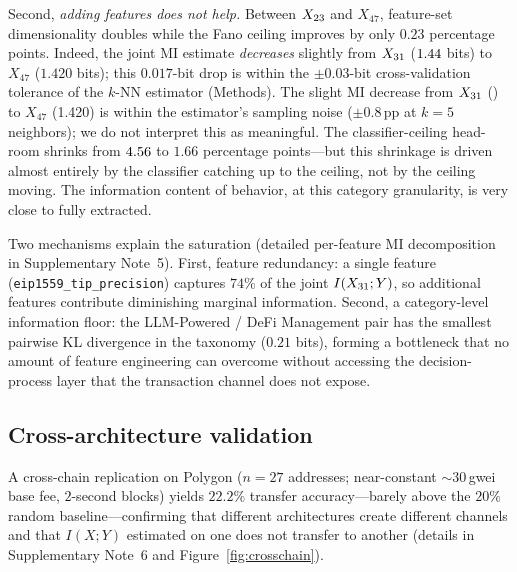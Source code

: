\documentclass[11pt,a4paper]{article}
\begin{document}
Second, \emph{adding features does not help.} Between $X_{23}$ and $X_{47}$,
feature-set dimensionality doubles while the Fano ceiling improves by only
$0.23$ percentage points. Indeed, the joint MI estimate \emph{decreases}
slightly from $X_{31}$ ($1.44$ bits) to $X_{47}$ ($1.420$ bits); this
$0.017$-bit drop is within the $\pm 0.03$-bit cross-validation tolerance
of the $k$-NN estimator (Methods). The slight MI decrease from $X_{31}$
(\fanoMiJointBitsfeat) to $X_{47}$ (1.420) is within the estimator's sampling noise
($\pm$0.8\,pp at $k{=}5$ neighbors); we do not interpret this as
meaningful.
The classifier-ceiling head-room shrinks from
$4.56$ to $1.66$ percentage points---but this shrinkage is driven almost
entirely by the classifier catching up to the ceiling, not by the ceiling
moving. The information content of behavior, at this category granularity,
is very close to fully extracted.

Two mechanisms explain the saturation (detailed per-feature MI
decomposition in Supplementary Note~5). First, feature redundancy: a
single feature (\texttt{eip1559\_tip\_precision}) captures $74\%$ of the
joint $I(X_{31};Y)$, so additional features contribute diminishing
marginal information. Second, a category-level information floor: the
LLM-Powered / DeFi Management pair has the smallest pairwise
KL divergence in the taxonomy ($0.21$ bits), forming a bottleneck that
no amount of feature engineering can overcome without accessing the
decision-process layer that the transaction channel does not expose.

\subsection*{Cross-architecture validation}

A cross-chain replication on Polygon ($n=27$ addresses; near-constant
${\sim}30$\,gwei base fee, $2$-second blocks) yields $22.2\%$ transfer
accuracy---barely above the $20\%$ random baseline---confirming that
different architectures create different channels and that $I(X;Y)$
estimated on one does not transfer to another (details in Supplementary
Note~6 and Figure~\ref{fig:crosschain}).

\end{document}
